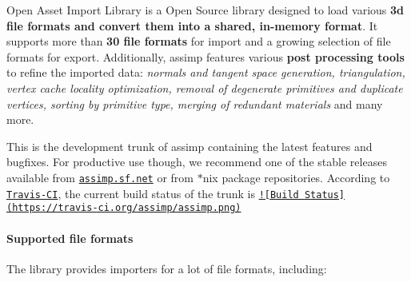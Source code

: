 Open Asset Import Library is a Open Source library designed to load various {\bfseries 3d file formats and convert them into a shared, in-\/memory format}. It supports more than {\bfseries 30 file formats} for import and a growing selection of file formats for export. Additionally, assimp features various {\bfseries post processing tools} to refine the imported data\+: {\itshape normals and tangent space generation, triangulation, vertex cache locality optimization, removal of degenerate primitives and duplicate vertices, sorting by primitive type, merging of redundant materials} and many more.

This is the development trunk of assimp containing the latest features and bugfixes. For productive use though, we recommend one of the stable releases available from \href{http://assimp.sf.net}{\tt assimp.\+sf.\+net} or from $\ast$nix package repositories. According to \href{https://travis-ci.org/}{\tt Travis-\/\+C\+I}, the current build status of the trunk is \href{https://travis-ci.org/assimp/assimp}{\tt !\mbox{[}Build Status\mbox{]}(https\+://travis-\/ci.\+org/assimp/assimp.\+png)}

\paragraph*{Supported file formats}

The library provides importers for a lot of file formats, including\+:


